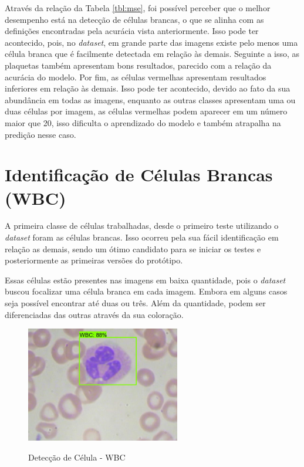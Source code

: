 Através da relação da Tabela \ref{tbl:mse}, foi possível perceber que o melhor desempenho está na detecção de células brancas, o que se alinha com as definições encontradas pela acurácia vista anteriormente. Isso pode ter acontecido, pois, no \emph{dataset}, em grande parte das imagens existe pelo menos uma célula branca que é facilmente detectada em relação às demais. Seguinte a isso, as plaquetas também apresentam bons resultados, parecido com a relação da acurácia do modelo. Por fim, as células vermelhas apresentam resultados inferiores em relação às demais. Isso pode ter acontecido, devido ao fato da sua abundância em todas as imagens, enquanto as outras classes apresentam uma ou duas células por imagem, as células vermelhas podem aparecer em um número maior que 20, isso dificulta o aprendizado do modelo e também atrapalha na predição nesse caso.

\section{Identificação de Células Brancas (WBC)}
A primeira classe de células trabalhadas, desde o primeiro teste utilizando o \emph{dataset} foram as células brancas. Isso ocorreu pela sua fácil identificação em relação as demais, sendo um ótimo candidato para se iniciar os testes e posteriormente as primeiras versões do protótipo.

Essas células estão presentes nas imagens em baixa quantidade, pois o \emph{dataset} buscou focalizar uma célula branca em cada imagem. Embora em alguns casos seja possível encontrar até duas ou três. Além da quantidade, podem ser diferenciadas das outras através da sua coloração.

\begin{figure}[!htb]
	\centering
	\caption{Detecção de Célula - WBC}
	\includegraphics[width=0.60\textwidth]{img/predict_wbc.jpeg}
	\label{fig:predict_wbc}
\end{figure}

